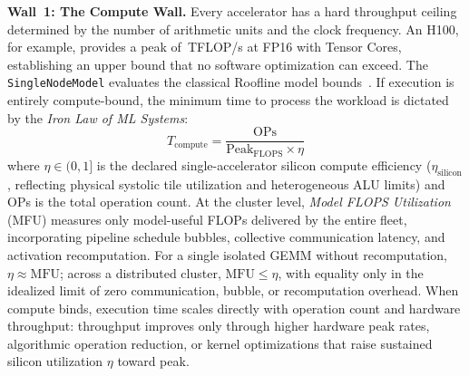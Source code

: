 \documentclass[10pt,twocolumn]{article}
\newcommand{\cvalint}[1]{\pgfmathprintnumber[fixed, precision=0, 1000 sep={\,}]{#1}}
\begin{document}
\textbf{Wall~1: The Compute Wall.} Every accelerator has a hard throughput ceiling determined by the number of arithmetic units and the clock frequency. An H100, for example, provides a peak of \cvalint{\HhPeakTFLOPS}\,TFLOP/s at FP16 with Tensor Cores, establishing an upper bound that no software optimization can exceed. The \texttt{SingleNodeModel} evaluates the classical Roofline model bounds~\citep{williams2009}. If execution is entirely compute-bound, the minimum time to process the workload is dictated by the \emph{Iron Law of ML Systems}:
\begin{equation}
\label{eq:tcompute}
T_{\text{compute}} = \frac{\text{OPs}}{\text{Peak}_{\text{FLOPS}} \times \eta}
\end{equation}
where $\eta \in (0,1]$ is the declared single-accelerator silicon compute efficiency ($\eta_{\text{silicon}}$, reflecting physical systolic tile utilization and heterogeneous ALU limits) and OPs is the total operation count. At the cluster level, \emph{Model FLOPS Utilization} (MFU) measures only model-useful FLOPs delivered by the entire fleet, incorporating pipeline schedule bubbles, collective communication latency, and activation recomputation. For a single isolated GEMM without recomputation, $\eta \approx \text{MFU}$; across a distributed cluster, $\text{MFU} \le \eta$, with equality only in the idealized limit of zero communication, bubble, or recomputation overhead. When compute binds, execution time scales directly with operation count and hardware throughput: throughput improves only through higher hardware peak rates, algorithmic operation reduction, or kernel optimizations that raise sustained silicon utilization $\eta$ toward peak.
\end{document}

